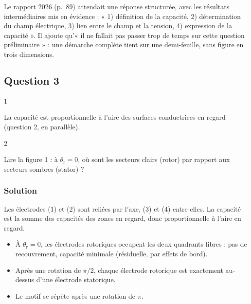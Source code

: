 \documentclass[11pt,a4paper]{article}
\providecommand{\tightlist}{\setlength{\itemsep}{0pt}\setlength{\parskip}{0pt}}
\begin{document}
\begin{jury}

Le rapport 2026 (p.~89) attendait une réponse structurée, avec les résultats intermédiaires mis en évidence : « 1) définition de la capacité, 2) détermination du champ électrique, 3) lien entre le champ et la tension, 4) expression de la capacité ». Il ajoute qu'« il ne fallait pas passer trop de temps sur cette question préliminaire » : une démarche complète tient sur une demi-feuille, sans figure en trois dimensions.

\end{jury}

\hypertarget{question-3}{%
\subsection{Question 3}\label{question-3}}

\begin{indication}{1}

La capacité est proportionnelle à l'aire des surfaces conductrices en regard (question 2, en parallèle).

\end{indication}

\begin{indication}{2}

Lire la figure 1 : à \(\theta_{\mathrm r}=0\), où sont les secteurs clairs (rotor) par rapport aux secteurs sombres (stator) ?

\end{indication}

\hypertarget{solution-2}{%
\subsubsection{Solution}\label{solution-2}}

Les électrodes (1) et (2) sont reliées par l'axe, (3) et (4) entre elles. La capacité est la somme des capacités des zones en regard, donc proportionnelle à l'aire en regard.

\begin{itemize}
\tightlist
\item
  À \(\theta_{\mathrm r}=0\), les électrodes rotoriques occupent les deux quadrants libres : pas de recouvrement, capacité minimale (résiduelle, par effets de bord).
\item
  Après une rotation de \(\pi/2\), chaque électrode rotorique est exactement au-dessus d'une électrode statorique.
\item
  Le motif se répète après une rotation de \(\pi\).
\end{itemize}
\end{document}
